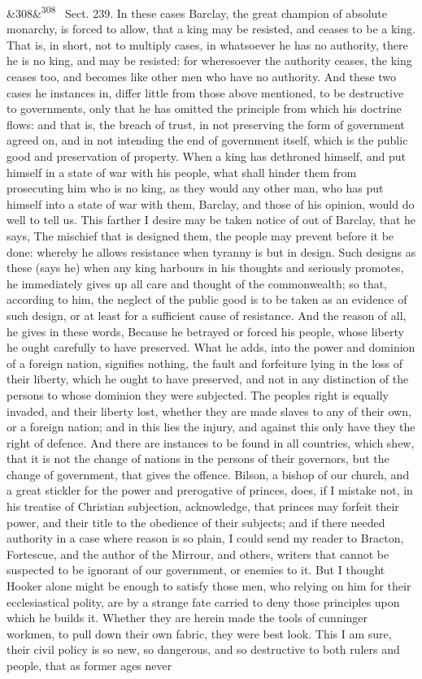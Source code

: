 \documentclass[12pt]{article}
\newcommand{\para}[1][]{\par\noindent\ifx&#1&\else\textsuperscript{\footnotesize #1}~\fi}
\begin{document}
\para[308] Sect. 239. In these cases Barclay, the great champion of absolute monarchy, is forced to allow, that a king may be resisted, and ceases to be a king. That is, in short, not to multiply cases, in whatsoever he has no authority, there he is no king, and may be resisted: for wheresoever the authority ceases, the king ceases too, and becomes like other men who have no authority. And these two cases he instances in, differ little from those above mentioned, to be destructive to governments, only that he has omitted the principle from which his doctrine flows: and that is, the breach of trust, in not preserving the form of government agreed on, and in not intending the end of government itself, which is the public good and preservation of property. When a king has dethroned himself, and put himself in a state of war with his people, what shall hinder them from prosecuting him who is no king, as they would any other man, who has put himself into a state of war with them, Barclay, and those of his opinion, would do well to tell us. This farther I desire may be taken notice of out of Barclay, that he says, The mischief that is designed them, the people may prevent before it be done: whereby he allows resistance when tyranny is but in design. Such designs as these (says he) when any king harbours in his thoughts and seriously promotes, he immediately gives up all care and thought of the commonwealth; so that, according to him, the neglect of the public good is to be taken as an evidence of such design, or at least for a sufficient cause of resistance. And the reason of all, he gives in these words, Because he betrayed or forced his people, whose liberty he ought carefully to have preserved. What he adds, into the power and dominion of a foreign nation, signifies nothing, the fault and forfeiture lying in the loss of their liberty, which he ought to have preserved, and not in any distinction of the persons to whose dominion they were subjected. The peoples right is equally invaded, and their liberty lost, whether they are made slaves to any of their own, or a foreign nation; and in this lies the injury, and against this only have they the right of defence. And there are instances to be found in all countries, which shew, that it is not the change of nations in the persons of their governors, but the change of government, that gives the offence. Bilson, a bishop of our church, and a great stickler for the power and prerogative of princes, does, if I mistake not, in his treatise of Christian subjection, acknowledge, that princes may forfeit their power, and their title to the obedience of their subjects; and if there needed authority in a case where reason is so plain, I could send my reader to Bracton, Fortescue, and the author of the Mirrour, and others, writers that cannot be suspected to be ignorant of our government, or enemies to it. But I thought Hooker alone might be enough to satisfy those men, who relying on him for their ecclesiastical polity, are by a strange fate carried to deny those principles upon which he builds it. Whether they are herein made the tools of cunninger workmen, to pull down their own fabric, they were best look. This I am sure, their civil policy is so new, so dangerous, and so destructive to both rulers and people, that as former ages never 
\end{document}
